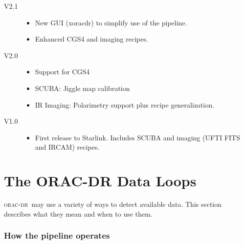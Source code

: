 \documentclass[twoside,11pt]{article}
\newcommand{\xlabel}[1]{}
\renewcommand{\_}{\texttt{\symbol{95}}}
\newcommand{\oracdr}{\textsc{orac-dr}}
\begin{document}
\begin{description}
\begin{itemize}
\end{itemize}

\item[V2.1]

\begin{itemize}

\item New GUI (xoracdr) to simplify use of the pipeline.

\item Enhanced CGS4 and imaging recipes.

\end{itemize}

\item[V2.0]

\begin{itemize}

\item Support for CGS4

\item SCUBA: Jiggle map calibration

\item IR Imaging: Polarimetry support plus recipe generalization.

\end{itemize}

\item[V1.0]

\begin{itemize}

\item First release to Starlink. Includes SCUBA and imaging (UFTI FITS
and IRCAM) recipes.

\end{itemize}

\end{description}


\appendix


\section{\xlabel{data_loops}The ORAC-DR Data Loops\label{The_ORAC-DR_Data_Loops}}

\oracdr\ may use a variety of ways to detect available data. This
section describes what they mean and when to use them.

\subsubsection*{How the pipeline operates\label{The_ORAC-DR_Data_Loops_How_the_pipeline_operates}}
\end{document}

